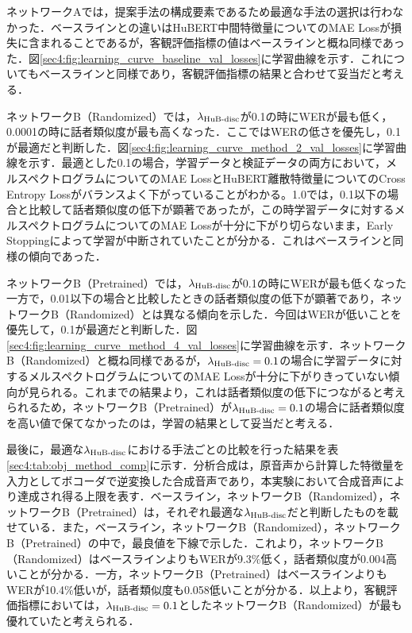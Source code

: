 ネットワークAでは，提案手法の構成要素であるため最適な手法の選択は行わなかった．ベースラインとの違いはHuBERT中間特徴量についてのMAE Lossが損失に含まれることであるが，客観評価指標の値はベースラインと概ね同様であった．図\ref{sec4:fig:learning_curve_baseline_val_losses}に学習曲線を示す．これについてもベースラインと同様であり，客観評価指標の結果と合わせて妥当だと考える．

ネットワークB（Randomized）では，$\lambda_{\text{HuB-disc}}$が0.1の時にWERが最も低く，0.0001の時に話者類似度が最も高くなった．ここではWERの低さを優先し，0.1が最適だと判断した．図\ref{sec4:fig:learning_curve_method_2_val_losses}に学習曲線を示す．最適とした0.1の場合，学習データと検証データの両方において，メルスペクトログラムについてのMAE LossとHuBERT離散特徴量についてのCross Entropy Lossがバランスよく下がっていることがわかる。1.0では，0.1以下の場合と比較して話者類似度の低下が顕著であったが，この時学習データに対するメルスペクトログラムについてのMAE Lossが十分に下がり切らないまま，Early Stoppingによって学習が中断されていたことが分かる．これはベースラインと同様の傾向であった．

ネットワークB（Pretrained）では，$\lambda_{\text{HuB-disc}}$が0.1の時にWERが最も低くなった一方で，0.01以下の場合と比較したときの話者類似度の低下が顕著であり，ネットワークB（Randomized）とは異なる傾向を示した．今回はWERが低いことを優先して，0.1が最適だと判断した．図\ref{sec4:fig:learning_curve_method_4_val_losses}に学習曲線を示す．ネットワークB（Randomized）と概ね同様であるが，$\lambda_{\text{HuB-disc}} = 0.1$の場合に学習データに対するメルスペクトログラムについてのMAE Lossが十分に下がりきっていない傾向が見られる。これまでの結果より，これは話者類似度の低下につながると考えられるため，ネットワークB（Pretrained）が$\lambda_{\text{HuB-disc}} = 0.1$の場合に話者類似度を高い値で保てなかったのは，学習の結果として妥当だと考える．

最後に，最適な$\lambda_{\text{HuB-disc}}$における手法ごとの比較を行った結果を表\ref{sec4:tab:obj_method_comp}に示す．分析合成は，原音声から計算した特徴量を入力としてボコーダで逆変換した合成音声であり，本実験において合成音声により達成され得る上限を表す．ベースライン，ネットワークB（Randomized），ネットワークB（Pretrained）は，それぞれ最適な$\lambda_{\text{HuB-disc}}$だと判断したものを載せている．また，ベースライン，ネットワークB（Randomized），ネットワークB（Pretrained）の中で，最良値を下線で示した．これより，ネットワークB（Randomized）はベースラインよりもWERが9.3\%低く，話者類似度が0.004高いことが分かる．一方，ネットワークB（Pretrained）はベースラインよりもWERが10.4\%低いが，話者類似度も0.058低いことが分かる．以上より，客観評価指標においては，$\lambda_{\text{HuB-disc}} = 0.1$としたネットワークB（Randomized）が最も優れていたと考えられる．

